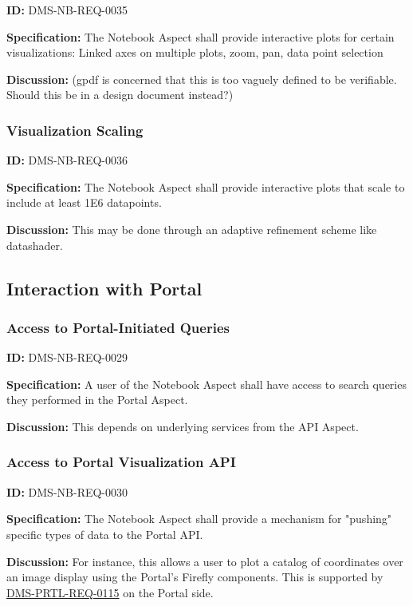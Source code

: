 \documentclass[SE,toc,lsstdraft]{lsstdoc}
\begin{document}
\label{DMS-NB-REQ-0035}
\textbf{ID:} DMS-NB-REQ-0035

\textbf{Specification:}
The Notebook Aspect shall provide interactive plots for certain visualizations:
Linked axes on multiple plots, zoom, pan, data point selection

\textbf{Discussion:}
(gpdf is concerned that this is too vaguely defined to be verifiable.  Should this be in a design document instead?)

\subsubsection{Visualization Scaling}

\label{DMS-NB-REQ-0036}
\textbf{ID:} DMS-NB-REQ-0036

\textbf{Specification:}
The Notebook Aspect shall provide interactive plots that scale to include at least 1E6 datapoints.

\textbf{Discussion:}
This may be done through an adaptive refinement scheme like datashader.

\subsection{Interaction with Portal}

\subsubsection{Access to Portal-Initiated Queries}

\label{DMS-NB-REQ-0029}
\textbf{ID:} DMS-NB-REQ-0029

\textbf{Specification:}
A user of the Notebook Aspect shall have access to search queries they performed in the Portal Aspect.

\textbf{Discussion:}
This depends on underlying services from the API Aspect.

\subsubsection{Access to Portal Visualization API}

\label{DMS-NB-REQ-0030}
\textbf{ID:} DMS-NB-REQ-0030

\textbf{Specification:}
The Notebook Aspect shall provide a mechanism for "pushing" specific types of data to the Portal API.

\textbf{Discussion:}
For instance, this allows a user to plot a catalog of coordinates over an image display using the Portal's Firefly components.  This is supported by \hyperref[DMS-PRTL-REQ-0115]{DMS-PRTL-REQ-0115} on the Portal side.
\end{document}

